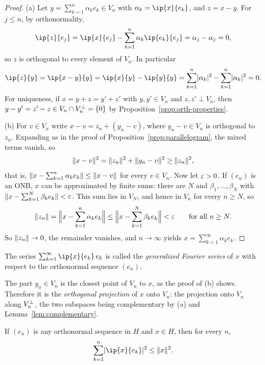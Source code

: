 \begin{proof}
(a) Let $y = \sum_{k=1}^{n} \alpha_k e_k \in V_n$ with
$\alpha_k = \ip{x}{e_k}$, and $z = x - y$. For $j \le n$, by orthonormality,
\[
  \ip{z}{e_j} = \ip{x}{e_j} - \sum_{k=1}^{n} \alpha_k \ip{e_k}{e_j}
  = \alpha_j - \alpha_j = 0 ,
\]
so $z$ is orthogonal to every element of $V_n$. In particular
\[
  \ip{z}{y} = \ip{x - y}{y} = \ip{x}{y} - \ip{y}{y}
  = \sum_{k=1}^{n} \abs{\alpha_k}^2 - \sum_{k=1}^{n} \abs{\alpha_k}^2 = 0 .
\]
For uniqueness, if $x = y + z = y' + z'$ with $y, y' \in V_n$ and
$z, z' \perp V_n$, then $y - y' = z' - z \in V_n \cap V_n^{\perp} = \{0\}$
by Proposition~\ref{prop:orth-properties}.

(b) For $v \in V_n$ write $x - v = z_n + (y_n - v)$, where
$y_n - v \in V_n$ is orthogonal to $z_n$. Expanding as in the proof of
Proposition~\ref{prop:parallelogram}, the mixed terms vanish, so
\[
  \lVert x - v\rVert^2 = \lVert z_n\rVert^2 + \lVert y_n - v\rVert^2 \ge \lVert z_n\rVert^2 ,
\]
that is, $\lVert x - \sum_{k=1}^{n} \alpha_k e_k\rVert \le \lVert x - v\rVert$ for every
$v \in V_n$. Now let $\varepsilon > 0$. If $(e_n)$ is an ONB, $x$ can be
approximated by finite sums: there are $N$ and $\beta_1, \dots, \beta_N$ with
$\lVert x - \sum_{k=1}^{N} \beta_k e_k\rVert < \varepsilon$. This sum lies in $V_N$, and
hence in $V_n$ for every $n \ge N$, so
\[
  \lVert z_n\rVert = \Bigl\lVert x - \sum_{k=1}^{n} \alpha_k e_k \Bigr\rVert
  \le \Bigl\lVert x - \sum_{k=1}^{N} \beta_k e_k \Bigr\rVert < \varepsilon
  \qquad \text{for all } n \ge N .
\]
So $\lVert z_n\rVert \to 0$, the remainder vanishes, and $n \to \infty$ yields
$x = \sum_{k=1}^{\infty} \alpha_k e_k$.
\end{proof}

\begin{remark}
The series $\sum_{k=1}^{\infty} \ip{x}{e_k}\, e_k$ is called the
\emph{generalized Fourier series} of $x$ with respect to the orthonormal
sequence $(e_n)$.
\end{remark}

\begin{remark}
The part $y_n \in V_n$ is the closest point of $V_n$ to $x$, as the proof of
(b) shows. Therefore it is the \emph{orthogonal projection} of $x$ onto
$V_n$: the projection onto $V_n$ along $V_n^{\perp}$, the two subspaces being
complementary by (a) and Lemma~\ref{lem:complementary}.
\end{remark}

\begin{corollary}\label{cor:bessel}
If $(e_n)$ is any orthonormal sequence in $H$ and $x \in H$, then for every
$n$,
\[
  \sum_{k=1}^{n} \abs{\ip{x}{e_k}}^2 \le \norm{x}^2 .
\]
\end{corollary}

